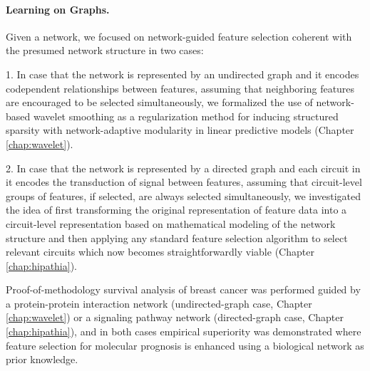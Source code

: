 \paragraph{Learning on Graphs.}

Given a network, we focused on network-guided feature selection coherent with the presumed network structure in two cases:
\begin{bulletList}
\item[1.] In case that the network is represented by an undirected graph and it encodes codependent relationships between features, assuming that neighboring features are encouraged to be selected simultaneously, we formalized the use of network-based wavelet smoothing as a regularization method for inducing structured sparsity with network-adaptive modularity in linear predictive models (Chapter \ref{chap:wavelet}).
\item[2.] In case that the network is represented by a directed graph and each circuit in it encodes the transduction of signal between features, assuming that circuit-level groups of features, if selected, are always selected simultaneously, we investigated the idea of first transforming the original representation of feature data into a circuit-level representation based on mathematical modeling of the network structure and then applying any standard feature selection algorithm to select relevant circuits which now becomes straightforwardly viable (Chapter \ref{chap:hipathia}).
\end{bulletList}
Proof-of-methodology survival analysis of breast cancer was performed guided by a protein-protein interaction network (undirected-graph case, Chapter \ref{chap:wavelet}) or a signaling pathway network (directed-graph case, Chapter \ref{chap:hipathia}), and in both cases empirical superiority was demonstrated where feature selection for molecular prognosis is enhanced using a biological network as prior knowledge.\\


